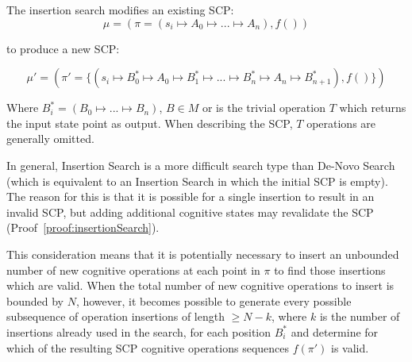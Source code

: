 The insertion search modifies an existing SCP:
\[\mu=(\pi=(s_i \longmapsto A_0 \longmapsto ... \longmapsto A_n),f())\]

to produce a new SCP:

\[
\mu'=(\pi'=\{(s_i \longmapsto B^*_0 \longmapsto A_0 \longmapsto B^*_1 \longmapsto ... \longmapsto  B^*_n \longmapsto A_n \longmapsto  B^*_{n+1}),f()\})
\] 

Where $B^*_i = (B_0\longmapsto ...\longmapsto B_n)$, $B \in M$  or is the trivial operation $T$ which returns the input state point as output. When describing the SCP, $T$ operations are generally omitted.

In general, Insertion Search is a more difficult search type than De-Novo Search (which is equivalent to an Insertion Search in which the initial SCP is empty). The reason for this is that it is possible for a single insertion to result in an invalid SCP, but adding additional cognitive states may revalidate the SCP (Proof~\ref{proof:insertionSearch}).

This consideration means that it is potentially necessary to insert an unbounded number of new cognitive operations at each point in $\pi$ to find those insertions which are valid. When the total number of new cognitive operations to insert is bounded by $N$, however, it becomes possible to generate every possible subsequence of operation insertions of length $\geq N-k$, where $k$ is the number of insertions already used in the search, for each position $B^*_i$ and determine for which of the resulting SCP cognitive operations sequences $f(\pi')$ is valid.












